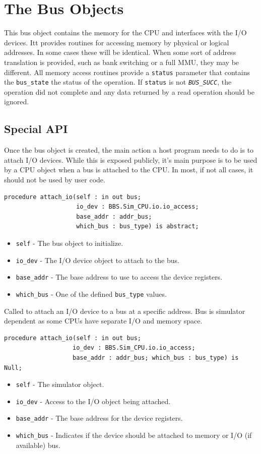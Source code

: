 \documentclass[10pt, openany]{book}
\newcommand{\constant}[1]{\emph{\texttt{#1}}}
\newcommand{\keyword}[1]{\texttt{#1}}
\newcommand{\datatype}[1]{\texttt{#1}}
\begin{document}
\chapter{The Bus Objects}
\label{chap:Bus}
This bus object contains the memory for the CPU and interfaces with the I/O devices.
Itt provides routines for accessing memory by physical or logical addresses.
In some cases these will be identical.
When some sort of address translation is provided, such as bank switching or a full MMU, they may be different.
All memory access routines provide a \keyword{status} parameter that contains the \datatype{bus\_state} the status of the operation.
If \keyword{status} is not \constant{BUS\_SUCC}, the operation did not complete and any data returned by a read operation should be ignored.

\section{Special API}
Once the bus object is created, the main action a host program needs to do is to attach I/O devices.
While this is exposed publicly, it's main purpose is to be used by a CPU object when a bus is attached to the
CPU.
In most, if not all cases, it should not be used by user code.
\begin{lstlisting}
procedure attach_io(self : in out bus;
                    io_dev : BBS.Sim_CPU.io.io_access;
                    base_addr : addr_bus;
                    which_bus : bus_type) is abstract;
\end{lstlisting}
\begin{itemize}
  \item \keyword{self} - The bus object to initialize.
  \item \keyword{io\_dev} - The I/O device object to attach to the bus.
  \item \keyword{base\_addr} - The base address to use to access the device registers.
  \item \keyword{which\_bus} - One of the defined \datatype{bus\_type} values.
\end{itemize}

Called to attach an I/O device to a bus at a specific address.
Bus is simulator dependent as some CPUs have separate I/O and memory space.
\begin{lstlisting}
procedure attach_io(self : in out bus;
                   io_dev : BBS.Sim_CPU.io.io_access;
                   base_addr : addr_bus; which_bus : bus_type) is Null;
\end{lstlisting}
\begin{itemize}
  \item \keyword{self} - The simulator object.
  \item \keyword{io\_dev} - Access to the I/O object being attached.
  \item \keyword{base\_addr} - The base address for the device registers.
  \item \keyword{which\_bus} - Indicates if the device should be attached to memory or I/O (if available) bus.
\end{itemize}
\end{document}
